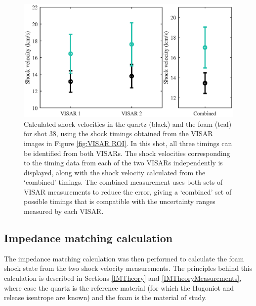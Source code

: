 \begin{figure} [h]
\begin{centering}
\includegraphics[width=1.0\textwidth]{figures/Experiment/VISARTiming.eps}%
\caption{\label{fig:VISAR Timing} Calculated shock velocities in the quartz (black) and the foam (teal)  for shot 38, using the shock timings obtained from the VISAR images in Figure \ref{fig:VISAR ROI}. In this shot, all three timings can be identified from both VISARs. The shock velocities corresponding to the timing data from each of the two VISARs independently is displayed, along with the shock velocity calculated from the `combined' timings. The combined measurement uses both sets of VISAR measurements to reduce the error, giving a `combined' set of possible timings that is compatible with the uncertainty ranges measured by each VISAR.}
\end{centering}
\end{figure}



\subsection{Impedance matching calculation} \label{IM calc}
The impedance matching calculation was then performed to calculate the foam shock state from the two shock velocity measurements. The principles behind this calculation is described in Sections \ref{IMTheory} and \ref{IMTheoryMeasurements}, where case the quartz is the reference material (for which the Hugoniot and release isentrope are known) and the foam is the material of study.

